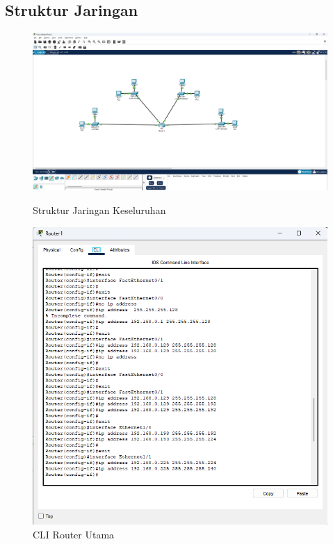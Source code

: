 \subsection{Struktur Jaringan}
\begin{figure}[H]
  \centering
  \begin{minipage}[t]{0.48\textwidth}
    \centering
    \includegraphics[width=\linewidth]{P1/img/StrukturJaringan.png}
    \caption{Struktur Jaringan Keseluruhan}
    \label{fig:struktur}
  \end{minipage}
  \hfill
  \begin{minipage}[t]{0.48\textwidth}
    \centering
    \includegraphics[width=\linewidth]{P1/img/cli.png}
    \caption{CLI Router Utama}
    \label{fig:cli}
  \end{minipage}
\end{figure}

